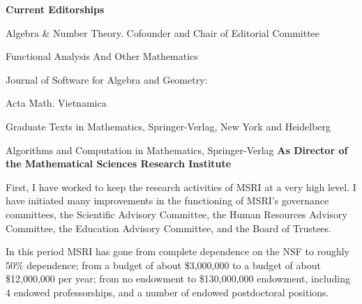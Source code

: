 \smallskip
{\bf Current Editorships}
\smallskip
%
\item{}Algebra \& Number Theory. Cofounder and Chair of Editorial Committee 
\item{}Functional Analysis And Other Mathematics 
\item{} Journal of Software for Algebra and Geometry: 
\item{} Acta Math. Vietnamica  
\item{} Graduate Texts in Mathematics, Springer-Verlag, New York and Heidelberg
\item{} Algorithms and Computation in Mathematics, Springer-Verlag
\medskip
{\bf As Director of the Mathematical Sciences Research Institute}
\smallskip
\item{} 
First, I have worked to keep the research activities of MSRI at a very high level. I have initiated many improvements in the functioning of MSRI's governance committees, the Scientific Advisory Committee, the Human Resources Advisory Committee, the Education Advisory Committee, and  the Board of Trustees.
\smallbreak
\item{} 
In this period MSRI has gone from complete dependence on the NSF to roughly 50\% dependence;  from a budget of about \$3,000,000 to a budget of about \$12,000,000 per year; from no endowment to \$130,000,000 endowment, including 4 endowed professorships, and a number of endowed postdoctoral positions.
